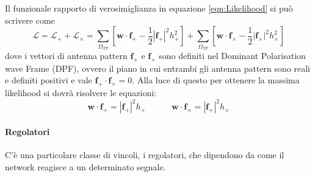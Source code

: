 Il funzionale rapporto di verosimiglianza in equazione \ref{eqn:Likelihood} si può scrivere come
\begin{equation}
	\mathcal{L} = \mathcal{L}_+ + \mathcal{L}_\times = \sum_{\Omega_{TF}}\left[ \textbf{w} \cdot \textbf{f}_+ - \frac{1}{2}|\textbf{f}_+|^2h_+^2\right] + \sum_{\Omega_{TF}}\left[ \textbf{w} \cdot \textbf{f}_\times - \frac{1}{2}|\textbf{f}_\times|^2h_\times^2\right]
	\label{eqn:label_separated}
\end{equation}
dove i vettori di antenna pattern $\textbf{f}_+$ e $\textbf{f}_\times$ sono definiti nel Dominant Polarisation wave Frame (DPF), ovvero il piano in cui entrambi gli antenna pattern sono reali e definiti positivi e vale $\textbf{f}_+ \cdot \textbf{f}_\times = 0$. Alla luce di questo per ottenere la massima likelihood si dovrà risolvere le equazioni:
\begin{equation}
	\textbf{w} \cdot \textbf{f}_+ = |\textbf{f}_+|^2h_+ \quad\quad\quad  \textbf{w} \cdot \textbf{f}_\times = |\textbf{f}_+|^2h_\times 
	\label{eqn:sistema_soluzione}
\end{equation}

\paragraph{Regolatori} C'è una particolare classe di vincoli, i regolatori, che dipendono da come il network reagisce a un determinato segnale.

